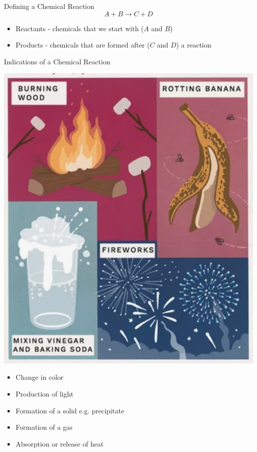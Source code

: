 \documentclass[11pt]{beamer}
\begin{document}
\begin{frame}{Defining a Chemical Reaction}
  \begin{equation}
    A + B \rightarrow C + D
    \label{eqn:chem}
  \end{equation}

  \begin{itemize}
  \item Reactants - chemicals that we start with ($A$ and $B$)
  \item Products - chemicals that are formed after ($C$ and $D$)
    a reaction
  \end{itemize}

\end{frame}

\begin{frame}{Indications of a Chemical Reaction}
  \begin{center}
    \includegraphics[scale=0.15]{chem_change}
  \end{center}

  \begin{itemize}
  \item Change in color
  \item Production of light
  \item Formation of a solid e.g. precipitate
  \item Formation of a gas
  \item Absorption or release of heat
  \end{itemize}
\end{frame}
\end{document}
